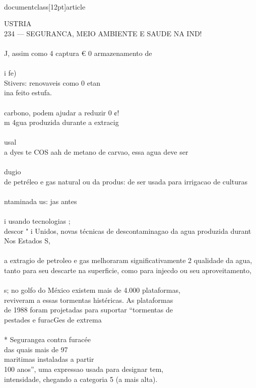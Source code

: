\\documentclass[12pt]{article}
\begin{document}
USTRIA\\
234 — SEGURANCA, MEIO AMBIENTE E SAUDE NA IND!\\
\\
J, assim como 4 captura € 0 armazenamento de\\
\\
i fe)\\
Stivers: renovaveis como 0 etan\\
ina feito estufa.\\
\\
carbono, podem ajudar a reduzir 0 ¢!\\
m 4gua produzida durante a extracig\\
\\
usal\\
a dyes te COS aah de metano de carvao, essa agua deve ser\\
\\
dugio\\
de petréleo e gas natural ou da produs: de ser usada para irrigacao de culturas\\
\\
ntaminada us: jas antes\\
\\
i usando tecnologias ;\\
descor " i Unidos, novas técnicas de descontaminagao da agua produzida durant\\
Nos Estados S,\\
\\
a extragio de petroleo e gas melhoraram significativamente 2 qualidade da agua,\\
tanto para seu descarte na superficie, como para injecdo ou seu aproveitamento,\\
\\
s; no golfo do México existem mais de 4.000 plataformas,\\
reviveram a essas tormentas histéricas. As plataformas\\
de 1988 foram projetadas para suportar “tormentas de\\
pestades e furacGes de extrema\\
\\
* Segurang¢a contra furacée\\
das quais mais de 97\\%
maritimas instaladas a partir\\
100 anos”, uma expressao usada para designar tem,\\
intensidade, chegando a categoria 5 (a mais alta).\\
\end{document}
